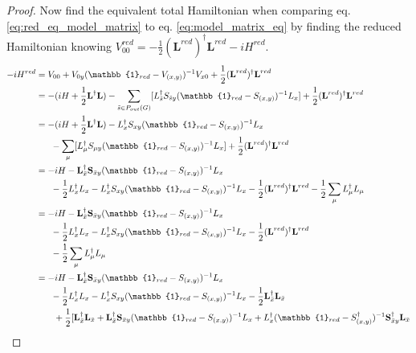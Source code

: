 \documentclass[a4paper]{article}
\theoremstyle{definition}
\begin{document}
\begin{enumerate}[label=(\roman*)]
\begin{proof}
Now find the equivalent total Hamiltonian when comparing eq. \ref{eq:red_eq_model_matrix} to eq. \ref{eq:model_matrix_eq} by finding the reduced Hamiltonian knowing $V^{red}_{00} = -\frac{1}{2}(\textbf{L}^{red})^\dagger \textbf{L}^{red}- iH^{red}$.
\begin{align*}
    -iH^{red} & = V_{00} + V_{0y} (\mathbb{1}_{red}-V_{(x,y)})^{-1}  V_{x0} + \frac{1}{2}(\textbf{L}^{red})^\dagger \textbf{L}^{red} \\
    & = -(iH + \frac{1}{2}\textbf{L}^\dagger \textbf{L})   -\sum_{\tilde{s} \in P_{out}(G)} [L_{\tilde{s}}^\dagger S_{\tilde{s}y} (\mathbb{1}_{red}-S_{(x,y)})^{-1} L_x] + \frac{1}{2}(\textbf{L}^{red})^\dagger \textbf{L}^{red} \\ 
    & = -(iH + \frac{1}{2}\textbf{L}^\dagger \textbf{L}) - L_x^\dagger S_{xy}(\mathbb{1}_{red}-S_{(x,y)})^{-1} L_x \\
    & \ \ \ \ \ -\sum_{\mu}[L_{\mu}^\dagger S_{\mu y} (\mathbb{1}_{red}-S_{(x,y)})^{-1} L_x] + \frac{1}{2}(\textbf{L}^{red})^\dagger \textbf{L}^{red} \\ 
    & = -iH  - \textbf{L}_{\Bar{x}}^\dagger \textbf{S}_{\Bar{x}y} (\mathbb{1}_{red}-S_{(x,y)})^{-1} L_x \\
    & \ \ \ \ \  - \frac{1}{2}L_x^\dagger L_x - L_x^\dagger S_{xy}(\mathbb{1}_{red}-S_{(x,y)})^{-1} L_x  - \frac{1}{2}(\textbf{L}^{red})^\dagger \textbf{L}^{red} - \frac{1}{2}\sum_{\mu} L_{\mu}^\dagger L_{\mu} \\
    & = -iH  - \textbf{L}_{\Bar{x}}^\dagger \textbf{S}_{\Bar{x}y} (\mathbb{1}_{red}-S_{(x,y)})^{-1} L_x \\
    & \ \ \ \ \  - \frac{1}{2}L_x^\dagger L_x - L_x^\dagger S_{xy}(\mathbb{1}_{red}-S_{(x,y)})^{-1} L_x - \frac{1}{2}(\textbf{L}^{red})^\dagger \textbf{L}^{red} \\
    & \ \ \ \ \  - \frac{1}{2}\sum_{\mu} L_{\mu}^\dagger L_{\mu}    \\
    & = -iH  - \textbf{L}_{\Bar{x}}^\dagger\textbf{S}_{\Bar{x}y} (\mathbb{1}_{red}-S_{(x,y)})^{-1} L_x \\
    & \ \ \ \ \  - \frac{1}{2}L_x^\dagger L_x - L_x^\dagger S_{xy}(\mathbb{1}_{red}-S_{(x,y)})^{-1} L_x - \frac{1}{2}\textbf{L}_{\Bar{x}}^\dagger \textbf{L}_{\Bar{x}}\\ 
    & \ \ \ \ \ \ + \frac{1}{2}[\textbf{L}_{\Bar{x}}^\dagger \textbf{L}_{\Bar{x}} + \textbf{L}_{\Bar{x}}^\dagger \textbf{S}_{\Bar{x}y}(\mathbb{1}_{red}-S_{(x,y)})^{-1}L_x + L_x^\dagger (\mathbb{1}_{red}-S_{(x,y)}^\dagger )^{-1} \textbf{S}_{\Bar{x}y}^\dagger \textbf{L}_{\Bar{x}} \\

\end{align*}
\end{proof}
\end{enumerate}
\end{document}

